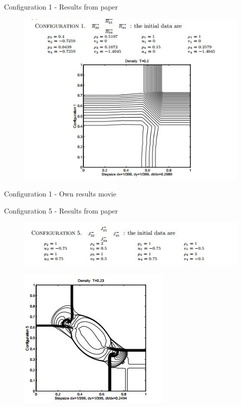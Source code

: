 
\begin{frame}{Configuration 1 - Results from paper}	
\begin{figure}
\centering
\includegraphics[width=0.8\linewidth]{../../figs/configuration1_paper}
\label{fig:configuration1_paper}
\end{figure}
\end{frame}

\begin{frame}{Configuration 1 - Own results}
	movie
\end{frame}

\begin{frame}{Configuration 5 - Results from paper}	
	
\begin{figure}
\centering
\includegraphics[width=0.6\linewidth]{../../figs/configuration5_paper_1}
\label{fig:configuration5_paper_1}
\end{figure}

\begin{figure}
\centering
\includegraphics[width=0.5\linewidth]{../../figs/configuration5_paper_2}
\label{fig:configuration5_paper_2}
\end{figure}

\end{frame}

